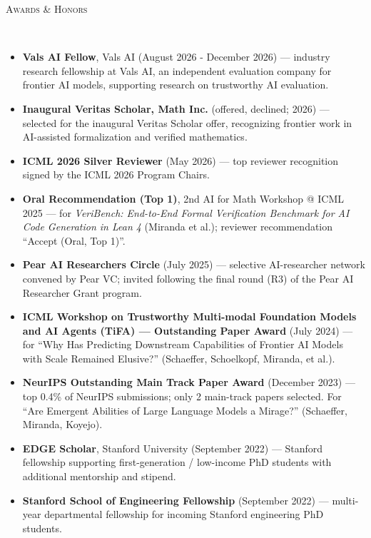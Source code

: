 \documentclass{article}
\newenvironment{changemargin}[2]{%
  \begin{list}{}{%
    \setlength{\topsep}{0pt}%
    \setlength{\leftmargin}{#1}%
    \setlength{\rightmargin}{#2}%
    \setlength{\listparindent}{\parindent}%
    \setlength{\itemindent}{\parindent}%
    \setlength{\parsep}{\parskip}%
  }%
  \item[]}{\end{list}
}
\newcommand{\lineover}{
	\begin{changemargin}{-0.05in}{-0.05in}
		\vspace*{-8pt}
		\hrulefill \\
		\vspace*{-2pt}
	\end{changemargin}
}
\newcommand{\header}[1]{
	\begin{changemargin}{-0.5in}{-0.5in}
		\scshape{#1}\\
  	\lineover
	\end{changemargin}
	\nopagebreak[4]    %
}
\newenvironment{body} {
		\vspace*{-16pt}
		\begin{changemargin}{-0.25in}{-0.5in}
	  }
		{\end{changemargin}\vspace{8pt plus 12pt}
	}
\begin{document}

\header{Awards \& Honors}
\begin{body}
\vspace{12pt}
\begin{itemize} \itemsep -2pt
    \item \textbf{Vals AI Fellow}, Vals AI (August 2026 - December 2026) --- industry research fellowship at Vals AI, an independent evaluation company for frontier AI models, supporting research on trustworthy AI evaluation.
    \item \textbf{Inaugural Veritas Scholar, Math Inc.} (offered, declined; 2026) --- selected for the inaugural Veritas Scholar offer, recognizing frontier work in AI-assisted formalization and verified mathematics.
    \item \textbf{ICML 2026 Silver Reviewer} (May 2026) --- top reviewer recognition signed by the ICML 2026 Program Chairs.
    \item \textbf{Oral Recommendation (Top 1)}, 2nd AI for Math Workshop @ ICML 2025 --- for \textit{VeriBench: End-to-End Formal Verification Benchmark for AI Code Generation in Lean 4} (Miranda et al.); reviewer recommendation ``Accept (Oral, Top 1)''.
    \item \textbf{Pear AI Researchers Circle} (July 2025) --- selective AI-researcher network convened by Pear VC; invited following the final round (R3) of the Pear AI Researcher Grant program.
    \item \textbf{ICML Workshop on Trustworthy Multi-modal Foundation Models and AI Agents (TiFA) --- Outstanding Paper Award} (July 2024) --- for ``Why Has Predicting Downstream Capabilities of Frontier AI Models with Scale Remained Elusive?'' (Schaeffer, Schoelkopf, Miranda, et al.).
    \item \textbf{NeurIPS Outstanding Main Track Paper Award} (December 2023) --- top 0.4\% of NeurIPS submissions; only 2 main-track papers selected. For ``Are Emergent Abilities of Large Language Models a Mirage?'' (Schaeffer, Miranda, Koyejo).
    \item \textbf{EDGE Scholar}, Stanford University (September 2022) --- Stanford fellowship supporting first-generation / low-income PhD students with additional mentorship and stipend.
    \item \textbf{Stanford School of Engineering Fellowship} (September 2022) --- multi-year departmental fellowship for incoming Stanford engineering PhD students.

\end{itemize}
\end{body}
\end{document}
